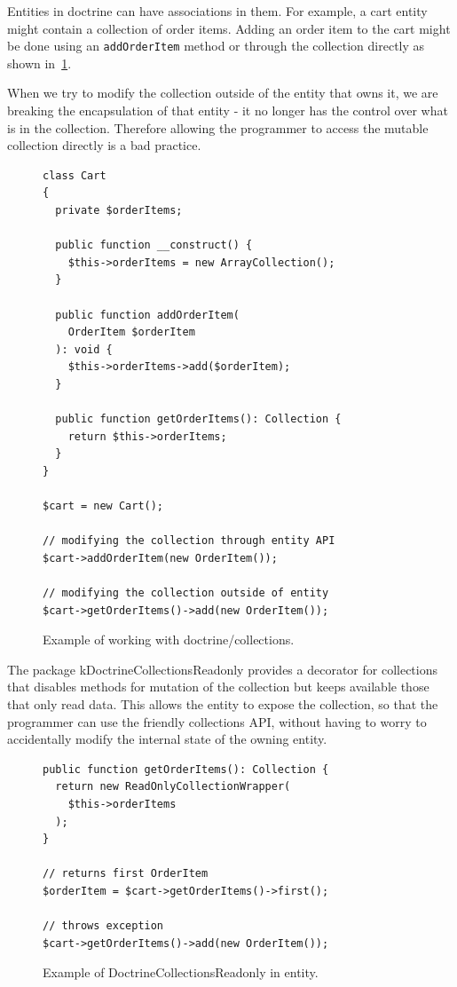 \label{sec:state:doctrine-collections-readonly}

Entities in \gls{doctrine} can have associations in them. For example, a cart entity might contain a collection of order items. Adding an order item to the cart might be done using an \lstinline{addOrderItem} method or through the collection directly as shown in~\ref{fig:collections-readonly:example}.

When we try to modify the collection outside of the entity that owns it, we are breaking the encapsulation of that entity - it no longer has the control over what is in the collection. Therefore allowing the programmer to access the mutable collection directly is a bad practice.

\begin{figure} \label{fig:collections-readonly:example}
\begin{lstlisting}
class Cart
{
  private $orderItems;

  public function __construct() {
    $this->orderItems = new ArrayCollection();
  }

  public function addOrderItem(
    OrderItem $orderItem
  ): void {
    $this->orderItems->add($orderItem);
  }

  public function getOrderItems(): Collection {
    return $this->orderItems;
  }
}

$cart = new Cart();

// modifying the collection through entity API
$cart->addOrderItem(new OrderItem());

// modifying the collection outside of entity
$cart->getOrderItems()->add(new OrderItem());
\end{lstlisting}
\caption{Example of working with doctrine/collections.}
\end{figure}

The package \gls{kDoctrineCollectionsReadonly} provides a decorator for collections that disables methods for mutation of the collection but keeps available those that only read data. This allows the entity to expose the collection, so that the programmer can use the friendly collections API, without having to worry to accidentally modify the internal state of the owning entity.

\begin{figure} \label{fig:collections-readonly:readonly}
\begin{lstlisting}
public function getOrderItems(): Collection {
  return new ReadOnlyCollectionWrapper(
    $this->orderItems
  );
}

// returns first OrderItem
$orderItem = $cart->getOrderItems()->first();

// throws exception
$cart->getOrderItems()->add(new OrderItem());
\end{lstlisting}
\caption{Example of DoctrineCollectionsReadonly in entity.}
\end{figure}

